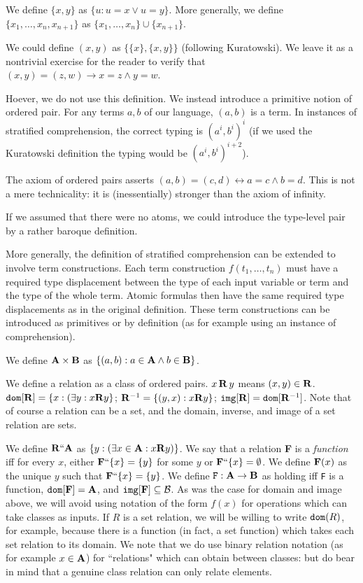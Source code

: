 \documentclass[12pt]{article}
\begin{document}
We define $\{x,y\}$ as $\{u:u=x \vee u=y\}$.  More generally, we define $\{x_1,\ldots,x_n,x_{n+1}\}$ as $\{x_1,\ldots,x_n\} \cup \{x_{n+1}\}$.

We could define $(x,y)$ as $\{\{x\},\{x,y\}\}$ (following Kuratowski).  We leave it as a nontrivial exercise for the reader to verify that $(x,y) = (z,w) \rightarrow x=z \wedge y=w$. 

Hoever, we do not use this definition.  We instead introduce a primitive notion of ordered pair.  For any terms $a,b$ of our language, $(a,b)$ is a term.  In instances of stratified comprehension,
the correct typing is $(a^i,b^i)^i$ (if we used the Kuratowski definition the typing would be $(a^i,b^i)^{i+2}$).  

The axiom of ordered pairs asserts $(a,b) = (c,d) \leftrightarrow a=c \wedge b=d$.  This is not a mere technicality:  it is (inessentially) stronger than the axiom of infinity.

If we assumed that there were no atoms, we could introduce the type-level pair by a rather baroque definition.

More generally, the definition of stratified comprehension can be extended to involve term constructions.  Each term construction $f(t_1,\ldots,t_n)$ must have a required type displacement between
the type of each input variable or term  and the type of the whole term.   Atomic formulas then have the same required type displacements as in the original definition.  These term constructions can be introduced as
primitives or by definition (as for example using an instance of comprehension).

 We define ${\bf A} \times {\bf B}$ as $\{(a,b):a \in {\bf A} \wedge b \in {\bf B}\}$.

We define a relation as a class of ordered pairs.  $x \, {\bf R} \, y$ means $(x,y) \in {\bf R}$.  ${\tt dom}[{\bf R}] = \{x: (\exists y:x {\bf R} y\}$;  ${\bf R}^{-1} = \{(y,x):x {\bf R} y\}$;  ${\tt img}[{\bf R}] = {\tt dom}[{\bf R}^{-1}]$.  Note that of course a relation can be a set, and the domain, inverse, and image of a set relation are sets.

We define ${\bf R}``{\bf A}$ as $\{y:(\exists x \in {\bf A}:x {\bf R} y)\}$.  We say that a relation {\bf F} is a {\em function\/} iff for every $x$, either ${\bf F}``\{x\} = \{y\}$ for some
$y$ or ${\bf F}``\{x\} = \emptyset$.  We define ${\bf F}(x)$ as the unique $y$ such that ${\bf F}``\{x\} = \{y\}$.  We define ${\tt F}:{\bf A} \rightarrow {\bf B}$ as holding iff {\tt F} is a function, ${\tt dom}[{\bf F}] = {\bf A}$, and ${\tt img}[{\bf F}] \subseteq {\cal B}$.  As was the case for domain and image above, we will
avoid using notation of the form $f(x)$ for operations which can take classes as inputs.  If $R$ is a set relation, we will be willing to write ${\tt dom}(R)$, for example, because
there is a function (in fact, a set function) which takes each set relation to its domain.  We note that we do use binary relation notation (as for example $x \in {\bf A}$) for ``relations" which can obtain between classes:  but do bear in mind that a genuine class relation can only relate elements.
\end{document}
